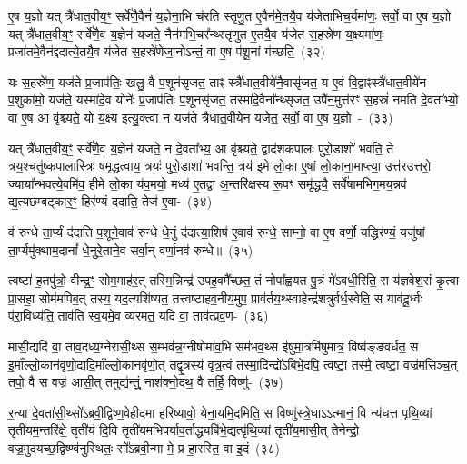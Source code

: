 ए॒ष य॒ज्ञो यत् त्रै॑धात॒वीय॒ꣳ॒ सर्वे॑णै॒वैनं॑ य॒ज्ञेना॒भि च॑रति स्तृणु॒त ए॒वैन॑मे॒तयै॒व य॑जेताभिच॒र्यमा॑णः॒ सर्वो॒ वा ए॒ष य॒ज्ञो यत् त्रै॑धात॒वीय॒ꣳ॒ सर्वे॑णै॒व य॒ज्ञेन॑ यजते॒ नैन॑मभि॒चर᳚न्थ्स्तृणुत ए॒तयै॒व य॑जेत स॒हस्रे॑ण य॒क्ष्यमा॑णः॒ प्रजा॑तमे॒वैन॑द्ददात्ये॒तयै॒व य॑जेत स॒हस्रे॑णेजा॒नो\-ऽन्तं॒ वा ए॒ष प॑शू॒नां ग॑च्छति॒~(३२)\ip

यः स॒हस्रे॑ण॒ यज॑ते प्र॒जा\-प॑तिः॒ खलु॒ वै प॒शून॑सृजत॒ ताꣴ स्त्रै॑धात॒वीये॑नै॒वासृ॑जत॒ य ए॒वं वि॒द्वाꣴस्त्रै॑धात॒वीये॑न प॒शुका॑मो॒ यज॑ते॒ यस्मा॑दे॒व योनेः᳚ प्र॒जा\-प॑तिः प॒शूनसृ॑जत॒ तस्मा॑दे॒वैना᳚न्थ्सृजत॒ उपै॑न॒मुत्त॑रꣳ स॒हस्रं॑ नमति दे॒वता᳚भ्यो॒ वा ए॒ष आ वृ॑श्च्यते॒ यो य॒क्ष्य इत्यु॒क्त्वा न यज॑ते त्रैधात॒वीये॑न यजेत॒ सर्वो॒ वा ए॒ष य॒ज्ञो~-~(३३)\ip

यत् त्रै॑धात॒वीय॒ꣳ॒ सर्वे॑णै॒व य॒ज्ञेन॑ यजते॒ न दे॒वता᳚भ्य॒ आ वृ॑श्च्यते॒ द्वाद॑श\-कपालः पुरो॒डाशो॑ भवति॒ ते त्रय॒श्चतु॑ष्कपालास्त्रिः षमृद्ध॒त्वाय॒ त्रयः॑ पुरो॒डाशा॑ भवन्ति॒ त्रय॑ इ॒मे लो॒का ए॒षां लो॒काना॒माप्त्या॒ उत्त॑रउत्तरो॒ ज्याया᳚न्भवत्ये॒वमि॑व॒ हीमे लो॒का य॑व॒मयो॒ मध्य॑ ए॒तद्वा अ॒न्त\-रि॑क्षस्य रू॒पꣳ समृ॑द्ध्यै॒ सर्वे॑षामभिग॒मय॒न्नव॑ द्य॒त्यछ॑म्बट्कार॒ꣳ॒ हिर॑ण्यं ददाति॒ तेज॑ ए॒वा-~(३४)\ip

व॑ रुन्धे ता॒र्प्यं द॑दाति प॒शूने॒वाव॑ रुन्धे धे॒नुं द॑दात्या॒शिष॑ ए॒वाव॑ रुन्धे॒ साम्नो॒ वा ए॒ष वर्णो॒ यद्धिर॑ण्यं॒ यजु॑षां ता॒र्प्यमु॑क्थाम॒दानां᳚ धे॒नुरे॒ताने॒व सर्वा॒न् वर्णा॒नव॑ रुन्धे॥~(३५)\ip

{\anuvakamend[{जग॑त्या\-ऽभि॒चर॒न्थ्सर्वो॒ वै ग॑च्छति य॒ज्ञस्तेज॑ ए॒व त्रि॒ꣳ॒शच्च॑}]}%

त्वष्टा॑ ह॒तपु॑त्रो॒ वीन्द्र॒ꣳ॒ सोम॒माह॑र॒त् तस्मि॒न्निन्द्र॑ उपह॒वमै᳚च्छत॒ तं नोपा᳚ह्वयत पु॒त्रं मे॑\-ऽवधी॒रिति॒ स य॑ज्ञवेश॒सं कृ॒त्वा प्रा॒सहा॒ सोम॑मपिब॒त् तस्य॒ यद॒त्यशि॑ष्यत॒ तत्त्वष्टा॑हव॒नीय॒मुप॒ प्राव॑र्तय॒थ्\-स्वाहेन्द्र॑शत्रुर्वर्ध॒स्वेति॒ स याव॑दू॒र्ध्वः प॑रा॒विध्य॑ति॒ ताव॑ति स्व॒यमे॒व व्य॑रमत॒ यदि॑ वा॒ ताव॑त्प्रव॒ण-~(३६)\ip

मासी॒द्यदि॑ वा॒ ताव॒दध्य॒ग्नेरासी॒थ्स स॒म्भव॑न्न॒ग्नी\-षोमा॑व॒भि सम॑भव॒थ्स इ॑षुमा॒त्रमि॑षुमात्रं॒ विष्व॑ङ्ङवर्धत॒ स इ॒माँल्लो॒कान॑वृणो॒द्य\-दि॒माँल्लो॒कान\-वृ॑णो॒त् तद्वृ॒त्रस्य॑ वृत्र॒त्वं तस्मा॒दिन्द्रो॑\-ऽबिभे॒दपि॒ त्वष्टा॒ तस्मै॒ त्वष्टा॒ वज्र॑मसिञ्च॒त् तपो॒ वै स वज्र॑ आसी॒त् तमुद्य॑न्तुं॒ नाश॑क्नो॒दथ॒ वै तर्\mbox{}हि॒ विष्णु॑-~(३७)\ip

र॒न्या दे॒वता॑सी॒थ्सो᳚\-ऽब्रवी॒द्विष्ण॒वेही॒दमा ह॑रिष्यावो॒ येना॒यमि॒दमिति॒ स विष्णु॑स्त्रे॒धा\-ऽऽ\-त्मानं॒ वि न्य॑धत्त पृथि॒व्यां तृती॑यम॒न्तरि॑क्षे॒ तृती॑यं दि॒वि तृती॑यमभिपर्याव॒र्ताद्ध्यबि॑भे॒द्यत्पृ॑थि॒व्यां तृती॑य॒मासी॒त् तेनेन्द्रो॒ वज्र॒मुद॑यच्छ॒द्विष्ण्व॑नुस्थितः॒ सो᳚\-ऽब्रवी॒न्मा मे॒ प्र हा॒रस्ति॒ वा इ॒दं~(३८)\ip

